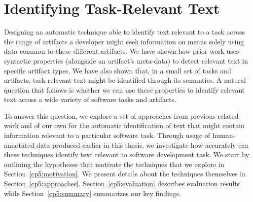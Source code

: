 \setcounter{chapter}{4}
\setcounter{rq}{1}


\chapter{Identifying Task-Relevant Text}
\label{ch:identifying}



Designing an automatic technique able to identify text relevant to a task across the range of artifacts a developer might seek information on means solely using data common to these different artifacts.
We have shown how  prior work uses syntactic properties (alongside an artifact's meta-data)
to detect relevant text in specific artifact types.
We have also shown that, in a small set of tasks and artifacts, task-relevant text might be identified through its semantics.
A natural question that follows is whether we can use these properties to identify relevant text across a wide variety of software tasks and artifacts.




To answer this question, we explore a set of approaches from previous related work and of our own 
for the automatic identification of text that might contain information relevant to a particular software task.
Through usage of human-annotated data produced earlier in this thesis, we 
investigate how accurately can these techniques identify text relevant to software development task.
We start by outlining the hypotheses that motivate the techniques that we explore in Section~\ref{cp5:motivation}.
We present details about the techniques themselves in Section~\ref{cp5:approaches}.
Section~\ref{cp5:evaluation} describes evaluation results while
Section~\ref{cp5:summary} summarizes our key findings.








